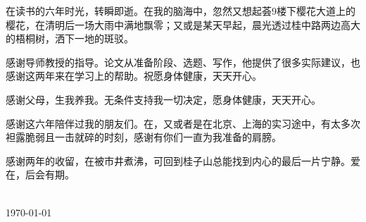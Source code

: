 
\acknowledgements
在读书的六年时光，转瞬即逝。在我的脑海中，忽然又想起荟9楼下樱花大道上的樱花，在清明后一场大雨中满地飘零；又或是某天早起，晨光透过桂中路两边高大的梧桐树，洒下一地的斑驳。

感谢导师教授的指导。论文从准备阶段、选题、写作，他提供了很多实际建议，也感谢这两年来在学习上的帮助。祝愿身体健康，天天开心。

感谢父母，生我养我。无条件支持我一切决定，愿身体健康，天天开心。

感谢这六年陪伴过我的朋友们。在，又或者是在北京、上海的实习途中，有太多次袒露脆弱且一击就碎的时刻，感谢有你们一直为我准备的肩膀。

感谢两年的收留，在被市井煮沸，可回到桂子山总能找到内心的最后一片宁静。爱在，后会有期。









\begin{signature}
   \\
  \today 
\end{signature}